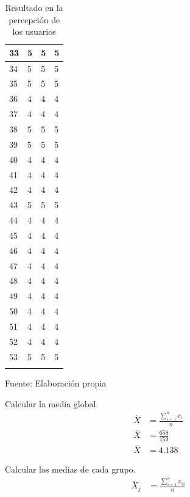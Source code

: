 \begin{center}
\begin{longtable}{|l|l|l|l|}
    \hline
    33 & 5 & 5 & 5 \\
    \hline
    34 & 5 & 5 & 5 \\
    \hline
    35 & 5 & 5 & 5 \\
    \hline
    36 & 4 & 4 & 4 \\
    \hline
    37 & 4 & 4 & 4 \\
    \hline
    38 & 5 & 5 & 5 \\
    \hline
    39 & 5 & 5 & 5 \\
    \hline
    40 & 4 & 4 & 4 \\
    \hline
    41 & 4 & 4 & 4 \\
    \hline
    42 & 4 & 4 & 4 \\
    \hline
    43 & 5 & 5 & 5 \\
    \hline
    44 & 4 & 4 & 4 \\
    \hline
    45 & 4 & 4 & 4 \\
    \hline
    46 & 4 & 4 & 4 \\
    \hline
    47 & 4 & 4 & 4 \\
    \hline
    48 & 4 & 4 & 4 \\
    \hline
    49 & 4 & 4 & 4 \\
    \hline
    50 & 4 & 4 & 4 \\
    \hline
    51 & 4 & 4 & 4 \\
    \hline
    52 & 4 & 4 & 4 \\
    \hline
    53 & 5 & 5 & 5 \\
    \hline
    \caption{Resultado en la percepción de los usuarios}
  \end{longtable}
  \vspace*{-2.5em}
  \centering Fuente: Elaboración propia
\end{center}

Calcular la media global.
\begin{equation*}
  \begin{split}
    \overline{X} & = \frac{\sum_{i=1}^{n} x_i}{n} \\
    \overline{X} & = \frac{658}{159} \\
    \overline{X} & = 4.138
  \end{split}
\end{equation*}

Calcular las medias de cada grupo.
\begin{equation*}
  \begin{split}
    \overline{X}_j & = \frac{\sum_{i=1}^{n} x_{ij}}{n}
  \end{split}
\end{equation*}

